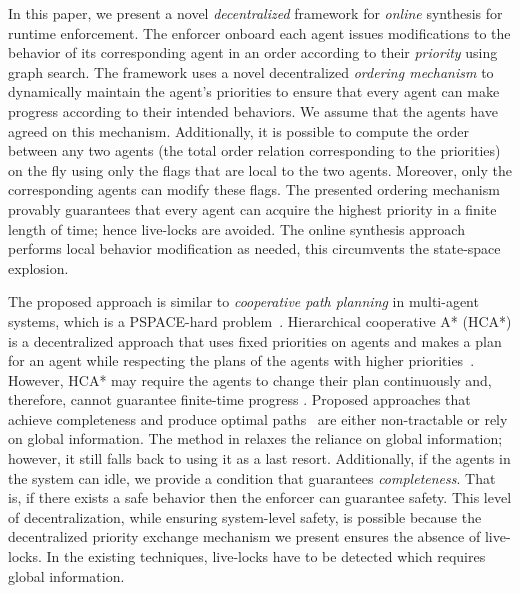 In this paper, we present a novel \emph{decentralized} framework for \emph{online} synthesis for runtime enforcement. The enforcer onboard each agent issues modifications to the behavior of its corresponding agent in an order according to their \emph{priority} using graph search.
The framework uses a novel decentralized \emph{ordering mechanism} to dynamically maintain the agent's priorities to ensure that every agent can make progress according to their intended behaviors. We assume that the agents have agreed on this mechanism. Additionally, it is possible to compute the order between any two agents (the total order relation corresponding to the priorities) on the fly using only the flags that are local to the two agents. Moreover, only the corresponding agents can modify these flags. The presented ordering mechanism provably guarantees that every agent can acquire the highest priority in a finite length of time; hence live-locks are avoided. The online synthesis approach performs local behavior modification as needed, this circumvents the state-space explosion.

The proposed approach is similar to \emph{cooperative path planning} in multi-agent systems, which is a PSPACE-hard problem~\cite{Hopcroft1984Dec}. Hierarchical cooperative A* (HCA*) is a decentralized approach that uses fixed priorities on agents and makes a plan for an agent while respecting the plans of the agents with higher priorities~\cite{Silver2005Jun}. However, HCA* may require the agents to change their plan continuously and, therefore, cannot guarantee finite-time progress \cite{Silver2005Jun}. Proposed approaches that achieve completeness and produce optimal paths~\cite{Standley2010Jul,Standley2011} are either non-tractable or rely on global information. The method in \cite{Zhang2016} relaxes the reliance on global information; however, it still falls back to using it as a last resort. Additionally, if the agents in the system can idle, we provide a condition that guarantees \emph{completeness}. That is, if there exists a safe behavior then the enforcer can guarantee safety. This level of decentralization, while ensuring system-level safety, is possible because the decentralized priority exchange mechanism we present ensures the absence of live-locks. In the existing techniques, live-locks have to be detected which requires global information. 

